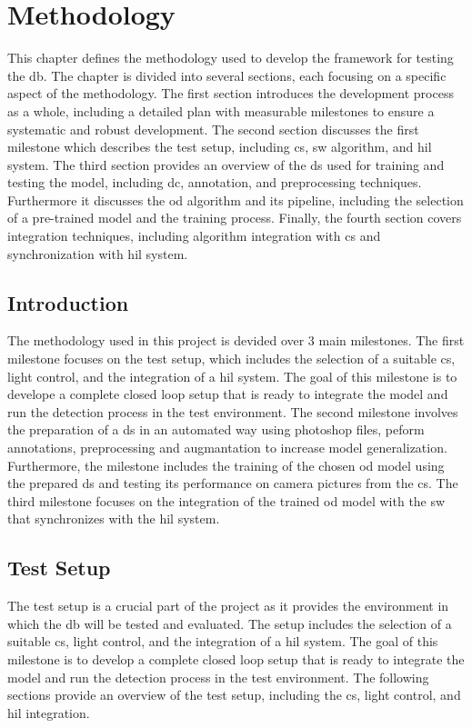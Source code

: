 

\chapter{Methodology} \label{ch:methodology}
This chapter defines the methodology used to develop the framework for testing the \gls{db}. The chapter is divided into several sections, each focusing on a specific aspect of the methodology. The first section introduces the development process as a whole, including a detailed plan with measurable milestones to ensure a systematic and robust development. The  second section discusses the first milestone which describes the test setup, including \gls{cs}, \gls{sw} algorithm, and \gls{hil} system. The third section provides an overview of the \gls{ds} used for training and testing the model, including \gls{dc}, annotation, and preprocessing techniques. Furthermore it discusses the \gls{od} algorithm and its pipeline, including the selection of a pre-trained model and the training process. Finally, the fourth section covers integration techniques, including algorithm integration with \gls{cs} and synchronization with \gls{hil} system.

\section{Introduction}
The methodology used in this project is devided over 3 main milestones. The first milestone focuses on the test setup, which includes the selection of a suitable \gls{cs}, light control, and the integration of a \gls{hil} system. The goal of this milestone is to develope a complete closed loop setup that is ready to integrate the model and run the detection process in the test environment. The second milestone involves the preparation of a \gls{ds} in an automated way using photoshop files, peform annotations, preprocessing and augmantation to increase model generalization. Furthermore, the  milestone includes the training of the chosen \gls{od} model using the prepared \gls{ds} and testing its performance on camera pictures from the \gls{cs}. The third milestone focuses on the integration of the trained \gls{od} model with the \gls{sw} that synchronizes with the \gls{hil} system.

\section{Test Setup}
The test setup is a crucial part of the project as it provides the environment in which the \gls{db} will be tested and evaluated. The setup includes the selection of a suitable \gls{cs}, light control, and the integration of a \gls{hil} system. The goal of this milestone is to develop a complete closed loop setup that is ready to integrate the model and run the detection process in the test environment. The following sections provide an overview of the test setup, including the \gls{cs}, light control, and \gls{hil} integration.

